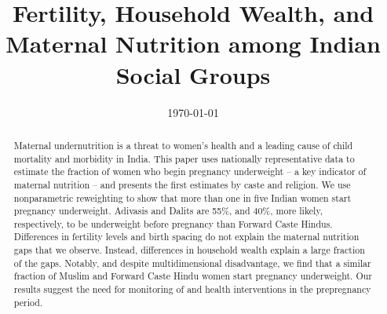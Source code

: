 \documentclass[12pt]{article}
\begin{document}
\RaggedRight


\setlength{\parindent}{0.25cm}   %
\setlength{\parskip}{0.5em}       %
 
\title{Fertility, Household Wealth, and Maternal Nutrition among Indian Social Groups} 
\date{\today} 
\maketitle
   

\singlespacing

\begin{abstract}
Maternal undernutrition is a threat to women’s health and a leading cause of child mortality and morbidity in India. This paper uses nationally representative data to estimate the fraction of women who begin pregnancy underweight -- a key indicator of maternal nutrition -- and presents the first estimates by caste and religion.  We use nonparametric reweighting to show that more than one in five Indian women start pregnancy underweight.  Adivasis and Dalits are 55\%, and 40\%, more likely, respectively, to be underweight before pregnancy than Forward Caste Hindus. Differences in fertility levels and birth spacing do not explain the maternal nutrition gaps that we observe.  Instead, differences in household wealth explain a large fraction of the gaps. Notably, and despite multidimensional disadvantage, we find that a similar fraction of Muslim and Forward Caste Hindu women start pregnancy underweight.  Our results suggest the need for monitoring of and health interventions in the prepregnancy period.
\end{abstract}


\newpage
\doublespacing
\end{document}
